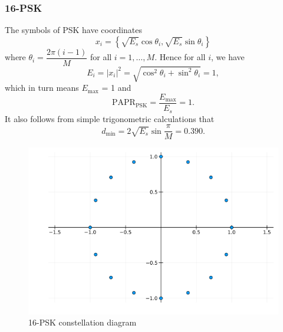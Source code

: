 \documentclass[11pt,a4paper,onecolumn,final]{article}
\begin{document}
\newpage

\subsubsection*{16-PSK}
The symbols of PSK have coordinates 
\begin{equation}
    x_i = \left\{ \sqrt{E_s}\cos \theta_i, \sqrt{E_s} \sin \theta_i \right\}
\end{equation}
where \(\theta_i = \dfrac{2\pi (i-1) }{M}\) for all \(i = 1, \ldots, M\). Hence for all \(i\), we have 
\begin{equation}
    E_i = |x_i|^2 = \sqrt{\cos ^2 \theta_i + \sin ^2 \theta_i} = 1,
\end{equation}
which in turn means \(E_\text{max}\) = 1 and
\begin{equation}
    \text{PAPR}_\text{PSK} = \frac{E_\text{max}}{E_s } = 1. 
\end{equation}
It also follows from simple trigonometric calculations that 
\begin{equation}
    d_\text{min} = 2\sqrt{E_s}\sin \frac{\pi}{M } = 0.390. 
\end{equation}

\begin{figure}[h]
    \centering
    \includegraphics[scale=0.7]{16psk.png}
    \caption{16-PSK constellation diagram}
\end{figure}
\end{document}
